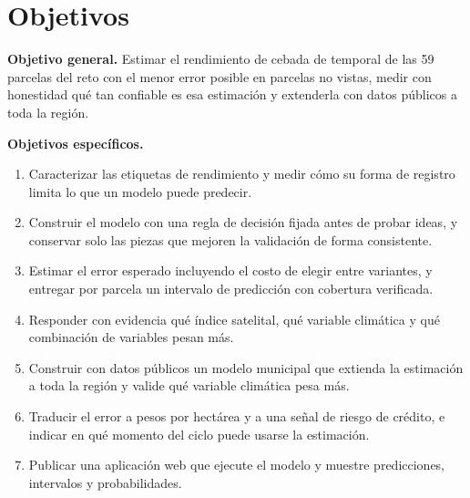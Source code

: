 \section{Objetivos}\label{sec:objetivos}

\textbf{Objetivo general.} Estimar el rendimiento de cebada de temporal de las 59 parcelas del reto con el menor error
posible en parcelas no vistas, medir con honestidad qué tan confiable es esa estimación y extenderla con datos
públicos a toda la región.

\textbf{Objetivos específicos.}
\begin{enumerate}
\item Caracterizar las etiquetas de rendimiento y medir cómo su forma de registro limita lo que un modelo puede predecir.
\item Construir el modelo con una regla de decisión fijada antes de probar ideas, y conservar solo las piezas que
mejoren la validación de forma consistente.
\item Estimar el error esperado incluyendo el costo de elegir entre variantes, y entregar por parcela un intervalo de
predicción con cobertura verificada.
\item Responder con evidencia qué índice satelital, qué variable climática y qué combinación de variables pesan más.
\item Construir con datos públicos un modelo municipal que extienda la estimación a toda la región y valide qué
variable climática pesa más.
\item Traducir el error a pesos por hectárea y a una señal de riesgo de crédito, e indicar en qué momento del ciclo puede
usarse la estimación.
\item Publicar una aplicación web que ejecute el modelo y muestre predicciones, intervalos y probabilidades.
\end{enumerate}
